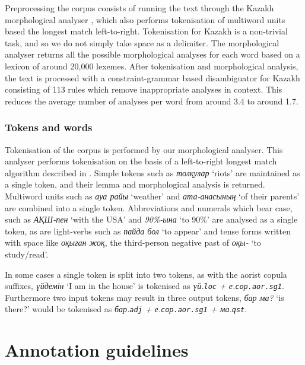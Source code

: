 \documentclass[a4paper,11pt, onecolumn,twoside]{article}
\newcommand{\gmk}[1]{{\rm {\sc \texttt{#1}}}}
\newcommand{\kazakh}[1]{{\em #1}}
\newcommand{\gloss}[1]{`#1'}
\begin{document}
Preprocessing the corpus consists of running the text through the Kazakh morphological
analyser \parencite{Washington14}, which also performs tokenisation of multiword units based 
the longest match left-to-right. Tokenisation for Kazakh is a non-trivial task, and so
we do not simply take space as a delimiter. The morphological analyser returns all 
the possible morphological analyses for each word based on a lexicon of around 20,000 lexemes.
After tokenisation and morphological analysis, the text is processed with a constraint-grammar 
based disambiguator for Kazakh consisting of 113 rules which remove inappropriate 
analyses in context. This reduces the average number of analyses per word from around 3.4
to around 1.7.


\subsubsection{Tokens and words}

Tokenisation of the corpus is performed by our morphological analyser. This analyser
performs tokenisation on the basis of a left-to-right longest match algorithm described
in \textcite{garrido02}. Simple tokens such as \kazakh{толқулар} \gloss{riots} are maintained
as a single token, and their lemma and morphological analysis is returned. Multiword
units such as \kazakh{ауа райы} \gloss{weather} and \kazakh{ата-анасының} \gloss{of their parents} are combined
into a single token. Abbreviations and numerals which bear case, such as \kazakh{АҚШ-пен} \gloss{with the USA}
and \kazakh{90\%-ына} \gloss{to 90\%} are analysed as a single token, as are light-verbs such as
\kazakh{пайда бол} \gloss{to appear} and tense forms written with space like \kazakh{оқыған жоқ},
the third-person negative past of \kazakh{оқы-} \gloss{to study/read}.

In some cases a single token is split into two tokens, as with the aorist copula suffixes,
\kazakh{үйдемін} \gloss{I am in the house} is tokenised as \kazakh{үй.\gmk{loc} + е.\gmk{cop.aor.sg1}}. Furthermore
two input tokens may result in three output tokens, \kazakh{бар ма?} \gloss{is there?} would be
tokenised as \kazakh{бар.\gmk{adj} + е.\gmk{cop.aor.sg1} + ма.\gmk{qst}}.



\section{Annotation guidelines}\label{sec:annotation}
\end{document}
